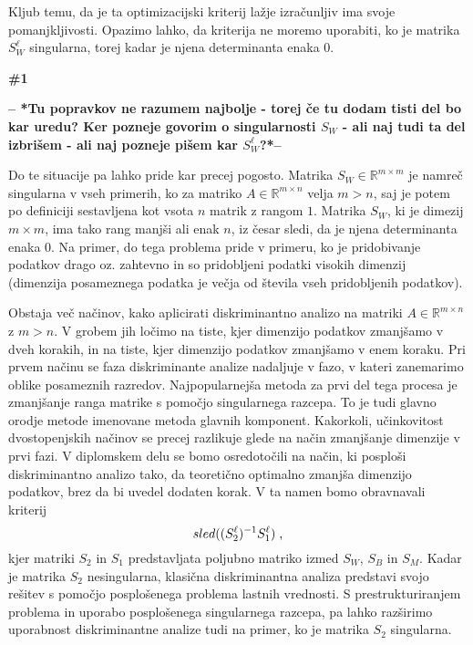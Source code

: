 \documentclass[mat1]{article}
\theoremstyle{definition}
\begin{document}
Kljub temu, da je ta optimizacijski kriterij lažje izračunljiv ima svoje pomanjkljivosti. Opazimo lahko, da kriterija ne moremo uporabiti, ko je matrika $S_W^\ell$ singularna, torej kadar je njena determinanta enaka 0. 

\begin{Large} \textbf{\#1} \end{Large}
\textbf{-- *Tu popravkov ne razumem najbolje - torej če tu dodam tisti del bo kar uredu? Ker pozneje govorim o singularnosti $S_W$ - ali naj tudi ta del izbrišem - ali naj pozneje pišem kar $S_W^\ell$?*--}


Do te situacije pa lahko pride kar precej pogosto. Matrika $S_W \in  \mathbb{R}^{m \times m}$ je namreč singularna v vseh primerih, ko za matriko $A \in  \mathbb{R}^{m \times n}$ velja $m > n$, saj je potem po definiciji sestavljena kot vsota $n$ matrik z rangom $1$. Matrika $S_W$, ki je dimezij $m \times m$, ima tako rang manjši ali enak $n$, iz česar sledi, da je njena determinanta enaka 0.
Na primer, do tega problema pride v primeru, ko je pridobivanje podatkov drago oz. zahtevno in so pridobljeni podatki visokih dimenzij (dimenzija posameznega podatka je večja od števila vseh pridobljenih podatkov).

Obstaja več načinov, kako aplicirati diskriminantno analizo na matriki $A \in \mathbb{R}^{m \times n}$ z $m > n$. V grobem jih ločimo na tiste, kjer dimenzijo podatkov zmanjšamo v dveh korakih, in na tiste, kjer dimenzijo podatkov zmanjšamo v enem koraku. Pri prvem načinu se faza diskriminante analize nadaljuje v fazo, v kateri zanemarimo oblike posameznih razredov. Najpopularnejša metoda za prvi del tega procesa je zmanjšanje ranga matrike s pomočjo singularnega razcepa. To je tudi glavno orodje metode imenovane metoda glavnih komponent. Kakorkoli, učinkovitost dvostopenjskih načinov se precej razlikuje glede na način zmanjšanje dimenzije v prvi fazi. V diplomskem delu se bomo osredotočili na način, ki posploši diskriminantno analizo tako, da teoretično optimalno zmanjša dimenzijo podatkov, brez da bi uvedel dodaten korak. V ta namen bomo obravnavali kriterij 
$$ sled((S_2^\ell)^{-1} S_1^\ell) \hspace{1mm} \text{,}
$$
kjer matriki $S_2$ in $S_1$ predstavljata poljubno matriko izmed $S_W$, $S_B$ in $S_M$.  Kadar je matrika $S_2$ nesingularna, klasična diskriminantna analiza predstavi svojo rešitev s pomočjo posplošenega problema lastnih vrednosti. S prestrukturiranjem problema in uporabo posplošenega singularnega razcepa, pa lahko razširimo uporabnost diskriminantne analize tudi na primer, ko je matrika $S_2$ singularna.
\end{document}
